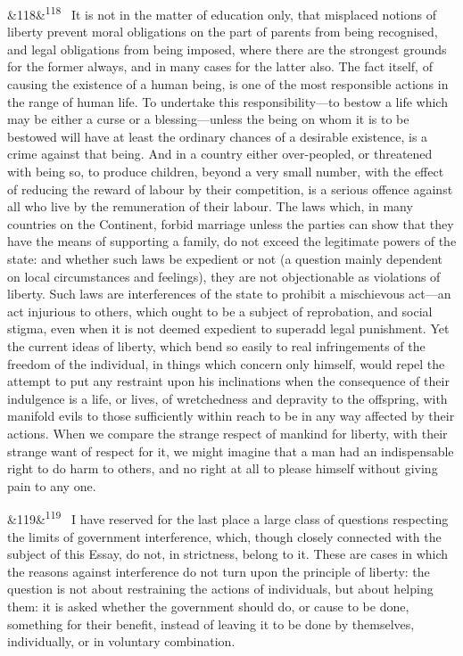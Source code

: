 \documentclass[12pt]{article}
\newcommand{\para}[1][]{\par\noindent\ifx&#1&\else\textsuperscript{\footnotesize #1}~\fi}
\begin{document}
\para[118] It is not in the matter of education only, that misplaced notions of liberty prevent moral obligations on the part of parents from being recognised, and legal obligations from being imposed, where there are the strongest grounds for the former always, and in many cases for the latter also. The fact itself, of causing the existence of a human being, is one of the most responsible actions in the range of human life. To undertake this responsibility---to bestow a life which may be either a curse or a blessing---unless the being on whom it is to be bestowed will have at least the ordinary chances of a desirable existence, is a crime against that being. And in a country either over-peopled, or threatened with being so, to produce children, beyond a very small number, with the effect of reducing the reward of labour by their competition, is a serious offence against all who live by the remuneration of their labour. The laws which, in many countries on the Continent, forbid marriage unless the parties can show that they have the means of supporting a family, do not exceed the legitimate powers of the state: and whether such laws be expedient or not (a question mainly dependent on local circumstances and feelings), they are not objectionable as violations of liberty. Such laws are interferences of the state to prohibit a mischievous act---an act injurious to others, which ought to be a subject of reprobation, and social stigma, even when it is not deemed expedient to superadd legal punishment. Yet the current ideas of liberty, which bend so easily to real infringements of the freedom of the individual, in things which concern only himself, would repel the attempt to put any restraint upon his inclinations when the consequence of their indulgence is a life, or lives, of wretchedness and depravity to the offspring, with manifold evils to those sufficiently within reach to be in any way affected by their actions. When we compare the strange respect of mankind for liberty, with their strange want of respect for it, we might imagine that a man had an indispensable right to do harm to others, and no right at all to please himself without giving pain to any one.

\para[119] I have reserved for the last place a large class of questions respecting the limits of government interference, which, though closely connected with the subject of this Essay, do not, in strictness, belong to it. These are cases in which the reasons against interference do not turn upon the principle of liberty: the question is not about restraining the actions of individuals, but about helping them: it is asked whether the government should do, or cause to be done, something for their benefit, instead of leaving it to be done by themselves, individually, or in voluntary combination.
\end{document}
